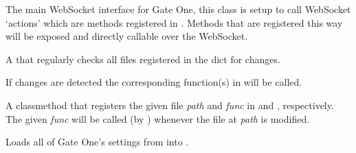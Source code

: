 \documentclass[letterpaper,10pt,openany]{sphinxmanual}
\begin{document}

\begin{fulllineitems}
\label{Developer/server:gateone.core.server.ApplicationWebSocket}
The main WebSocket interface for Gate One, this class is setup to call
WebSocket `actions' which are methods registered in .
Methods that are registered this way will be exposed and directly callable
over the WebSocket.

\begin{fulllineitems}
\label{Developer/server:gateone.core.server.ApplicationWebSocket.file_checker}
A  that regularly checks all files
registered in the  dict for changes.

If changes are detected the corresponding function(s) in
 will be called.

\end{fulllineitems}


\begin{fulllineitems}
\label{Developer/server:gateone.core.server.ApplicationWebSocket.watch_file}
A classmethod that registers the given file \emph{path} and \emph{func} in
 and
, respectively.  The given
\emph{func} will be called (by {\hyperref[Developer/server:gateone.core.server.ApplicationWebSocket.file_checker]{}}) whenever
the file at \emph{path} is modified.

\end{fulllineitems}


\begin{fulllineitems}
\label{Developer/server:gateone.core.server.ApplicationWebSocket.load_prefs}
Loads all of Gate One's settings from  into
.


\end{fulllineitems}
\end{fulllineitems}
\end{document}
